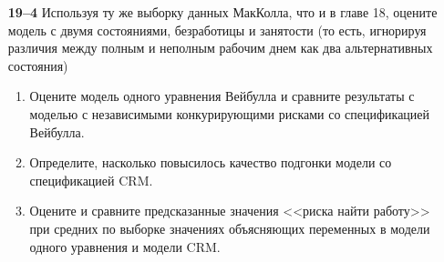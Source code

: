 \begin{enumerate}
    \item[\textbf{19--4}]
Используя ту же выборку данных МакКолла, что и в главе 18, %
оцените модель с двумя состояниями, безработицы и занятости (то есть, игнорируя различия между полным и неполным рабочим днем как два альтернативных состояния)
        \begin{enumerate}
        \item
Оцените модель одного уравнения Вейбулла и сравните результаты с моделью с независимыми конкурирующими рисками со спецификацией Вейбулла.
        \item
Определите, насколько повысилось качество подгонки модели со спецификацией CRM.
        \item
Оцените и сравните предсказанные значения <<риска найти работу>> при средних по выборке значениях объясняющих переменных в модели одного уравнения и модели CRM.
        \end{enumerate}

\end{enumerate}
